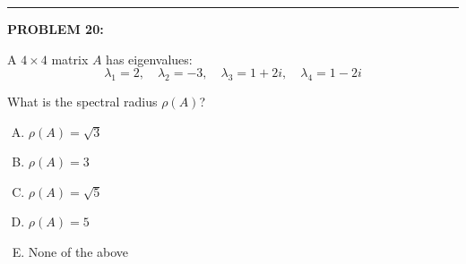 \documentclass[12pt]{amsart}
\newcommand{\divider}{
  \vspace{-1em} %
  \noindent
  \raisebox{-0.15ex}{\textbullet}%
  \hspace{0.5em}%
  \rule[0.5ex]{0.95\textwidth}{1.0pt}%
  \hspace{0.5em}%
  \raisebox{-0.15ex}{\textbullet}%
  \vspace{0em} %
}
\begin{document}

\divider

\newpage


{\bf PROBLEM 20:}

A $4 \times 4$ matrix $A$ has eigenvalues:
$$\lambda_1 = 2, \quad \lambda_2 = -3, \quad \lambda_3 = 1 + 2i, \quad \lambda_4 = 1 - 2i$$

What is the spectral radius $\rho(A)$?

\begin{enumerate}[(A)]
\item $\rho(A) = \sqrt{3}$
\item $\rho(A) = 3$
\item $\rho(A) = \sqrt{5}$
\item $\rho(A) = 5$
\item None of the above
\end{enumerate}

\end{document}
